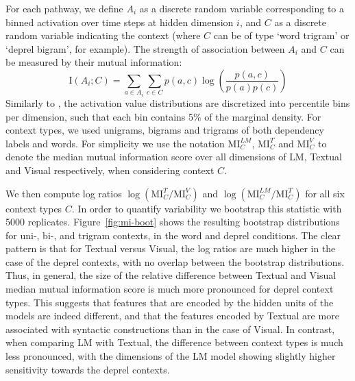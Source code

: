 For each pathway, we define $A_i$ as a discrete random variable corresponding 
to a binned activation over time steps at hidden dimension $i$, and $C$ 
as a discrete random variable indicating the context 
(where $C$ can be of type `word trigram' or `deprel bigram', for example). 
The strength of association between $A_i$ and $C$ can be measured 
by their mutual information:
\[
\mathrm{I}(A_i;C) = \sum_{a\in{A_i}}\sum_{c\in{C}} p(a,c)\log\left(\frac{p(a,c)}{p(a)p(c)}\right) 
\]
Similarly to , the activation value distributions are discretized 
into percentile bins per dimension, such that each bin contains 5\% of the marginal 
density. For context types, we used unigrams, bigrams and trigrams of both dependency labels 
and words. For simplicity we use the notation $\mathrm{MI}^\mathit{LM}_C$,  $\mathrm{MI}^T_C$ and  $\mathrm{MI}^V_C$ 
to denote the median mutual information score over all dimensions of {\sc LM}, {\sc Textual} and {\sc Visual} 
respectively, when considering context $C$. 


We then compute log ratios $\log(\mathrm{MI}^{T}_{C}/\mathrm{MI}^{V}_{C})$ and $\log(\mathrm{MI}^\mathit{LM}_{C}/\mathrm{MI}^{T}_{C})$
for all six context types $C$. In order to quantify variability we bootstrap this statistic with
5000 replicates. Figure~\ref{fig:mi-boot} shows the resulting bootstrap distributions 
for uni-, bi-, and trigram contexts, in the word and deprel conditions. The clear pattern is 
that for {\sc Textual} versus {\sc Visual}, the log ratios are much higher in the case of the deprel contexts, with no overlap between
the bootstrap distributions. Thus, in general, the size of the
relative difference between {\sc Textual} and {\sc Visual} median
mutual information score is much more pronounced for deprel context types.
This suggests that features that are encoded by the hidden units of
the models are indeed different, and that the features encoded by {\sc Textual} are more 
associated with syntactic constructions than in the case of  {\sc Visual}. In contrast, when comparing {\sc LM} with {\sc Textual}, the difference between context types is much less pronounced, with the dimensions of the {\sc LM} model showing slightly higher sensitivity towards the deprel contexts.

